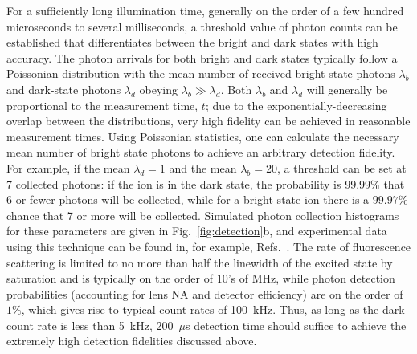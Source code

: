 \documentclass[%
12pt,
 amsmath,amssymb,
]{revtex4-2}
\newcommand{\zero}{|0 \rangle}
\newcommand{\one}{|1 \rangle}
\begin{document}

For a sufficiently long illumination time, generally on the order of a few hundred microseconds to several milliseconds, a threshold value of photon counts can be established that differentiates between the bright and dark states with high accuracy. The photon arrivals for both bright and dark states typically follow a Poissonian distribution with the mean number of received bright-state photons $\lambda_b$ and dark-state photons $\lambda_d$ obeying $\lambda_b \gg \lambda_d$. Both $\lambda_b$ and $\lambda_d$ will generally be proportional to the measurement time, $t$; due to the exponentially-decreasing overlap between the distributions, very high fidelity can be achieved in reasonable measurement times. Using Poissonian statistics, one can calculate the necessary mean number of bright state photons to achieve an arbitrary detection fidelity. For example, if the mean $\lambda_d = 1$ and the mean $\lambda_b = 20$, a threshold can be set at 7 collected photons: if the ion is in the dark state, the probability is $99.99 \%$ that 6 or fewer photons will be collected, while for a bright-state ion there is a $99.97 \%$ chance that 7 or more will be collected. Simulated photon collection histograms for these parameters are given in Fig.~\ref{fig:detection}b, and experimental data using this technique can be found in, for example, Refs.~\cite{itano1988precise,NIST:HifiMicrogate:12}.  The rate of fluorescence scattering is limited to no more than half the linewidth of the excited state by saturation and is typically on the order of $10$'s of MHz, while photon detection probabilities (accounting for lens NA and detector efficiency) are on the order of $1 \%$, which gives rise to typical count rates of 100~kHz. Thus, as long as the dark-count rate is less than 5~kHz, 200~$\mu$s detection time should suffice to achieve the extremely high detection fidelities discussed above.
\end{document}
